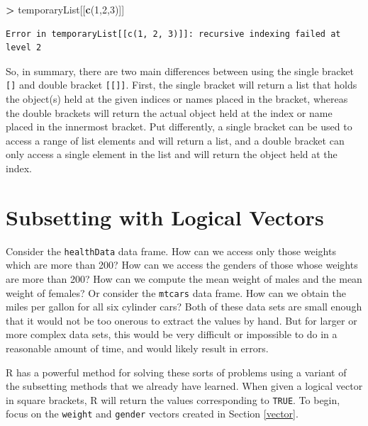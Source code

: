 \documentclass[]{krantz}
\makeatletter
\newenvironment{Shaded}{\begin{snugshade}}{\end{snugshade}}
\newcommand{\KeywordTok}[1]{\textcolor[rgb]{0.27,0.27,0.27}{\textbf{#1}}}
\newcommand{\DecValTok}[1]{\textcolor[rgb]{0.06,0.06,0.06}{#1}}
\newcommand{\StringTok}[1]{\textcolor[rgb]{0.5,0.5,0.5}{#1}}
\newcommand{\OperatorTok}[1]{\textcolor[rgb]{0.43,0.43,0.43}{\textbf{#1}}}
\newcommand{\NormalTok}[1]{#1}
\newenvironment{kframe}{%
\medskip{}
\setlength{\fboxsep}{.8em}
 \def\at@end@of@kframe{}%
 \ifinner\ifhmode%
  \def\at@end@of@kframe{\end{minipage}}%
  \begin{minipage}{\columnwidth}%
 \fi\fi%
 \def\FrameCommand##1{\hskip\@totalleftmargin \hskip-\fboxsep
 \colorbox{shadecolor}{##1}\hskip-\fboxsep
     \hskip-\linewidth \hskip-\@totalleftmargin \hskip\columnwidth}%
 \MakeFramed {\advance\hsize-\width
   \@totalleftmargin\z@ \linewidth\hsize
   \@setminipage}}%
 {\par\unskip\endMakeFramed%
 \at@end@of@kframe}
\renewenvironment{Shaded}{\begin{kframe}}{\end{kframe}}
\makeatother
\begin{document}
\begin{Shaded}
\begin{Highlighting}[]
\OperatorTok{>}\StringTok{ }\NormalTok{temporaryList[[}\KeywordTok{c}\NormalTok{(}\DecValTok{1}\NormalTok{,}\DecValTok{2}\NormalTok{,}\DecValTok{3}\NormalTok{)]]}
\end{Highlighting}
\end{Shaded}

\begin{verbatim}
Error in temporaryList[[c(1, 2, 3)]]: recursive indexing failed at level 2
\end{verbatim}

So, in summary, there are two main differences between using the single
bracket \texttt{{[}{]}} and double bracket \texttt{{[}{[}{]}{]}}. First,
the single bracket will return a list that holds the object(s) held at
the given indices or names placed in the bracket, whereas the double
brackets will return the actual object held at the index or name placed
in the innermost bracket. Put differently, a single bracket can be used
to access a range of list elements and will return a list, and a double
bracket can only access a single element in the list and will return the
object held at the index.

\section{Subsetting with Logical Vectors}\label{subsetting}

Consider the \texttt{healthData} data frame. How can we access only
those weights which are more than 200? How can we access the genders of
those whose weights are more than 200? How can we compute the mean
weight of males and the mean weight of females? Or consider the
\texttt{mtcars} data frame. How can we obtain the miles per gallon for
all six cylinder cars? Both of these data sets are small enough that it
would not be too onerous to extract the values by hand. But for larger
or more complex data sets, this would be very difficult or impossible to
do in a reasonable amount of time, and would likely result in errors.

R has a powerful method for solving these sorts of problems using a
variant of the subsetting methods that we already have learned. When
given a logical vector in square brackets, R will return the values
corresponding to \texttt{TRUE}. To begin, focus on the \texttt{weight}
and \texttt{gender} vectors created in Section \ref{vector}.
\end{document}

